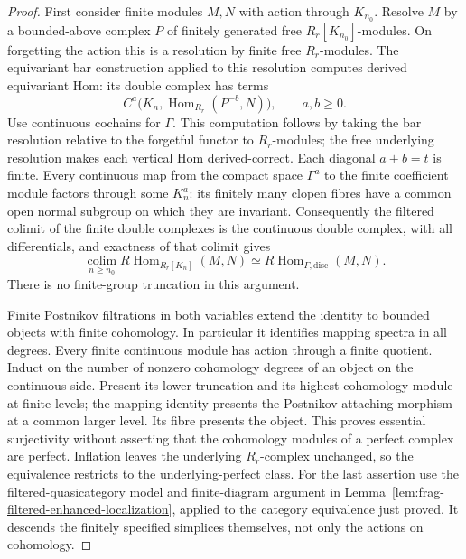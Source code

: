 \documentclass[11pt]{article}
\theoremstyle{definition}
\theoremstyle{remark}
\begin{document}
\begin{proof}
First consider finite modules $M,N$ with action through $K_{n_0}$.
Resolve $M$ by a bounded-above complex $P$ of finitely generated free
$R_r[K_{n_0}]$-modules.  On forgetting the action this is a resolution
by finite free $R_r$-modules.  The equivariant bar construction applied
to this resolution computes derived equivariant Hom: its double complex
has terms
\[
 C^a\bigl(K_n,\operatorname{Hom}_{R_r}(P^{-b},N)\bigr),
 \qquad a,b\ge0.
\]
Use continuous cochains for $\Gamma$.  This computation follows by taking
the bar resolution relative to the forgetful functor to $R_r$-modules;
the free underlying resolution makes each vertical Hom derived-correct.
Each diagonal $a+b=t$ is finite.  Every continuous map from the compact
space $\Gamma^a$ to the finite coefficient module factors through some
$K_n^a$: its finitely many clopen fibres have a common open normal
subgroup on which they are invariant.  Consequently the filtered colimit
of the finite double complexes is the continuous double complex, with
all differentials, and exactness of that colimit gives
\[
\operatorname*{colim}_{n\ge n_0}
 R\operatorname{Hom}_{R_r[K_n]}(M,N)
 \simeq R\operatorname{Hom}_{\Gamma,\mathrm{disc}}(M,N).
\]
There is no finite-group truncation in this argument.

Finite Postnikov filtrations in both variables extend the identity to
bounded objects with finite cohomology.  In particular it identifies
mapping spectra in all degrees.  Every finite continuous
module has action through a finite quotient.  Induct on the number of
nonzero cohomology degrees of an object on the continuous side.  Present
its lower truncation and its highest cohomology module at finite levels;
the mapping identity presents the Postnikov attaching morphism at a
common larger level.  Its fibre presents the object.  This proves essential
surjectivity without asserting that the cohomology modules of a perfect
complex are perfect.  Inflation leaves the underlying $R_r$-complex
unchanged, so the equivalence restricts to the underlying-perfect class.
For the last assertion use the filtered-quasicategory model and
finite-diagram argument in
Lemma~\ref{lem:frag-filtered-enhanced-localization}, applied to the
category equivalence just proved.  It descends the finitely specified
simplices themselves, not only the actions on cohomology.
\end{proof}
\end{document}
